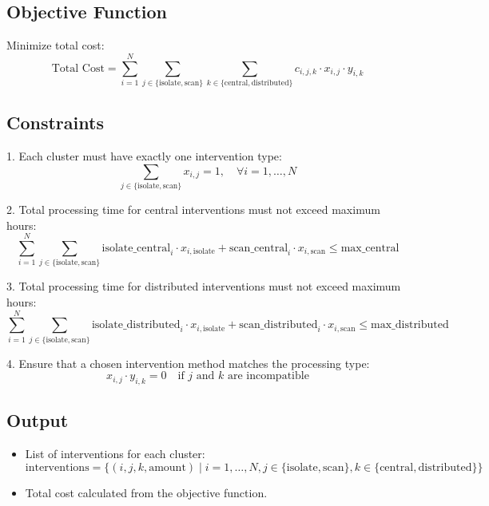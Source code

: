 \documentclass{article}
\begin{document}
\subsection*{Objective Function}
Minimize total cost:
\[
\text{Total Cost} = \sum_{i=1}^{N} \sum_{j \in \{ \text{isolate}, \text{scan} \}} \sum_{k \in \{ \text{central}, \text{distributed} \}} c_{i,j,k} \cdot x_{i,j} \cdot y_{i,k}
\]

\subsection*{Constraints}
1. Each cluster must have exactly one intervention type:
\[
\sum_{j \in \{ \text{isolate}, \text{scan} \}} x_{i,j} = 1, \quad \forall i = 1, \ldots, N
\]

2. Total processing time for central interventions must not exceed maximum hours:
\[
\sum_{i=1}^{N} \sum_{j \in \{ \text{isolate}, \text{scan} \}} \text{isolate\_central}_i \cdot x_{i,\text{isolate}} + \text{scan\_central}_i \cdot x_{i,\text{scan}} \leq \text{max\_central}
\]

3. Total processing time for distributed interventions must not exceed maximum hours:
\[
\sum_{i=1}^{N} \sum_{j \in \{ \text{isolate}, \text{scan} \}} \text{isolate\_distributed}_i \cdot x_{i,\text{isolate}} + \text{scan\_distributed}_i \cdot x_{i,\text{scan}} \leq \text{max\_distributed}
\]

4. Ensure that a chosen intervention method matches the processing type:
\[
x_{i,j} \cdot y_{i,k} = 0 \quad \text{if } j \text{ and } k \text{ are incompatible}
\]

\subsection*{Output}
\begin{itemize}
    \item List of interventions for each cluster: 
    \[
    \text{interventions} = \{ (i, j, k, \text{amount}) \mid i = 1, \ldots, N, j \in \{ \text{isolate}, \text{scan} \}, k \in \{ \text{central}, \text{distributed} \} \}
    \]
    \item Total cost calculated from the objective function.
\end{itemize}
\end{document}
